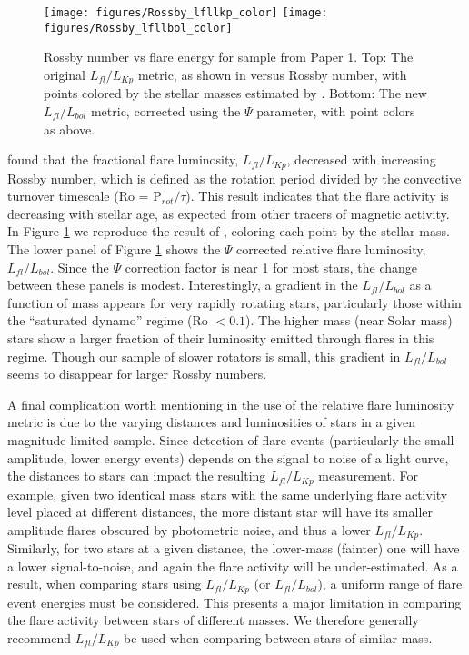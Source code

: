 \documentclass[preprint2]{aastex62}
\begin{document}
\begin{figure}[!t]
\centering
\texttt{[image: figures/Rossby\_lfllkp\_color]}
\texttt{[image: figures/Rossby\_lfllbol\_color]}
\caption{
Rossby number vs flare energy for sample from Paper 1.
Top: The original $L_{fl}/L_{Kp}$ metric, as shown in \citet{davenport2016} versus Rossby number, with points colored by the stellar masses estimated by \citet{davenport2016} .
Bottom: The new $L_{fl}/L_{bol}$ metric, corrected using the $\Psi$ parameter, with point colors as above.
}
\label{fig:rossby1}
\end{figure}
  

\citet{davenport2016} found that the fractional flare luminosity, $L_{fl}/L_{Kp}$, decreased with increasing Rossby number, which is defined as the rotation period divided by the convective turnover timescale (Ro = P$_{rot} / \tau$). This result indicates that the flare activity is decreasing with stellar age, as expected from other tracers of magnetic activity. In Figure \ref{fig:rossby1} we reproduce the result of \citet{davenport2016}, coloring each point by the stellar mass. The lower panel of Figure \ref{fig:rossby1} shows the $\Psi$ corrected relative flare luminosity, $L_{fl}/L_{bol}$. Since the $\Psi$ correction factor is near 1 for most stars, the change between these panels is modest. Interestingly, a gradient in the $L_{fl}/L_{bol}$ as a function of mass appears for very rapidly rotating stars, particularly those within the ``saturated dynamo'' regime (Ro $< 0.1$). The higher mass (near Solar mass) stars show a larger fraction of their luminosity emitted through flares in this regime. Though our sample of slower rotators is small, this gradient in $L_{fl}/L_{bol}$ seems to disappear for larger Rossby numbers. 

A final complication worth mentioning in the use of the relative flare luminosity metric is due to the varying distances and luminosities of stars in a given magnitude-limited sample. Since detection of flare events (particularly the small-amplitude, lower energy events) depends on the signal to noise of a light curve, the distances to stars can impact the resulting $L_{fl}/L_{Kp}$ measurement. For example, given two identical mass stars with the same underlying flare activity level placed at different distances, the more distant star will have its smaller amplitude flares obscured by photometric noise, and thus a lower $L_{fl}/L_{Kp}$. Similarly, for two stars at a given distance, the lower-mass (fainter) one will have a lower signal-to-noise, and again the flare activity will be under-estimated. As a result, when comparing stars using $L_{fl}/L_{Kp}$ (or $L_{fl}/L_{bol}$), a uniform range of flare event energies must be considered. This presents a major limitation in comparing the flare activity between stars of different masses. We therefore generally recommend $L_{fl}/L_{Kp}$ be used when comparing between stars of similar mass.
\end{document}
